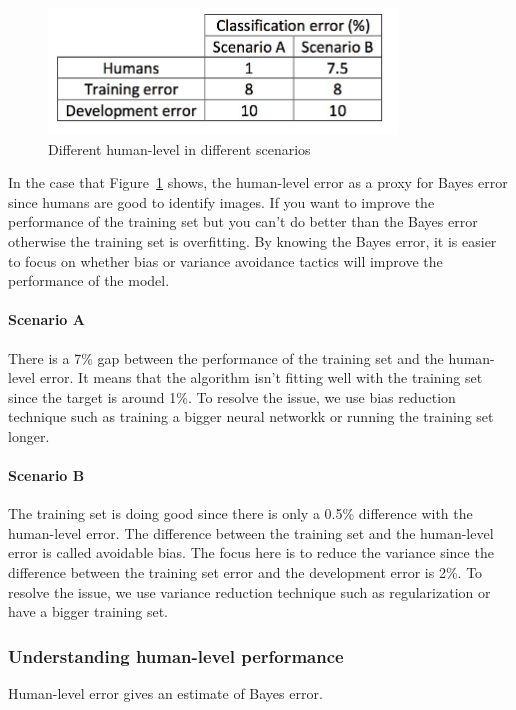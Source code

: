 \documentclass[UTF8]{article}
\begin{document}
\begin{figure}[htb]
    \centering
    \includegraphics[width=25em]{figures/avoidable-bias}
    \caption{Different human-level in different scenarios}
    \label{fig:avoidable-bias}
\end{figure}

In the case that Figure~\ref{fig:avoidable-bias} shows, the human-level error as a proxy for
Bayes error since humans are good to identify images. If you want to improve the performance of the
training set but you can't do better than the Bayes error otherwise the training set is overfitting.
By knowing the Bayes error, it is easier to focus on whether bias or variance avoidance tactics
will improve the performance of the model.

\paragraph{Scenario A}
There is a 7\% gap between the performance of the training set and the human-level error. It means
that the algorithm isn't fitting well with the training set since the target is around 1\%. To
resolve the issue, we use bias reduction technique such as training a bigger neural networkk or
running the training set longer.

\paragraph{Scenario B}
The training set is doing good since there is only a 0.5\% difference with the human-level error.
The difference between the training set and the human-level error is called avoidable bias. The
focus here is to reduce the variance since the difference between the training set error and the
development error is 2\%. To resolve the issue, we use variance reduction technique such as
regularization or have a bigger training set.

\subsubsection{Understanding human-level performance}
Human-level error gives an estimate of Bayes error.
\end{document}
